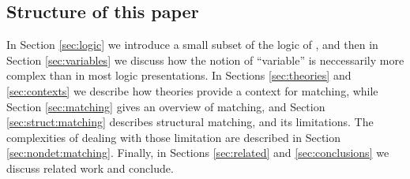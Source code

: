 \subsection{Structure of this paper}

In Section \ref{sec:logic} we introduce a small subset of the logic of ,
and then in Section \ref{sec:variables} we discuss how the notion
of ``variable'' is neccessarily more complex than in most logic presentations.
In Sections \ref{sec:theories} and \ref{sec:contexts}
we describe how  theories provide a context for matching,
while Section \ref{sec:matching} gives an overview of matching,
and Section \ref{sec:struct:matching} describes structural matching,
and its limitations.
The complexities of dealing with those limitation are described in Section \ref{sec:nondet:matching}.
Finally, in Sections \ref{sec:related} and \ref{sec:conclusions} we discuss related work and conclude.
